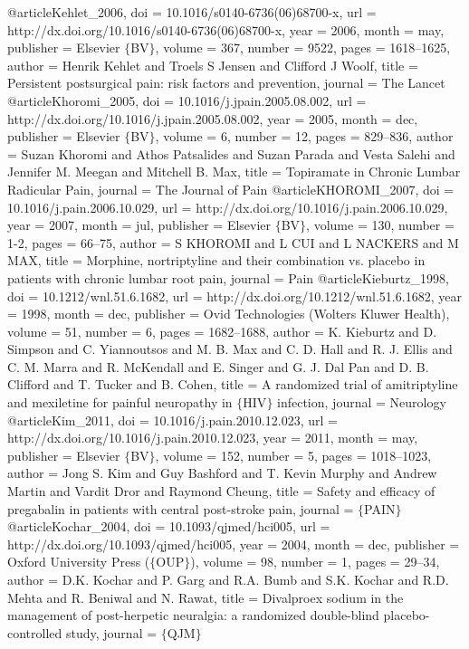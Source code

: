 @article{Kehlet_2006,
	doi = {10.1016/s0140-6736(06)68700-x},
	url = {http://dx.doi.org/10.1016/s0140-6736(06)68700-x},
	year = 2006,
	month = {may},
	publisher = {Elsevier $\lbrace$BV$\rbrace$},
	volume = {367},
	number = {9522},
	pages = {1618--1625},
	author = {Henrik Kehlet and Troels S Jensen and Clifford J Woolf},
	title = {Persistent postsurgical pain: risk factors and prevention},
	journal = {The Lancet}
}
@article{Khoromi_2005,
	doi = {10.1016/j.jpain.2005.08.002},
	url = {http://dx.doi.org/10.1016/j.jpain.2005.08.002},
	year = 2005,
	month = {dec},
	publisher = {Elsevier $\lbrace$BV$\rbrace$},
	volume = {6},
	number = {12},
	pages = {829--836},
	author = {Suzan Khoromi and Athos Patsalides and Suzan Parada and Vesta Salehi and Jennifer M. Meegan and Mitchell B. Max},
	title = {Topiramate in Chronic Lumbar Radicular Pain},
	journal = {The Journal of Pain}
}
@article{KHOROMI_2007,
	doi = {10.1016/j.pain.2006.10.029},
	url = {http://dx.doi.org/10.1016/j.pain.2006.10.029},
	year = 2007,
	month = {jul},
	publisher = {Elsevier $\lbrace$BV$\rbrace$},
	volume = {130},
	number = {1-2},
	pages = {66--75},
	author = {S KHOROMI and L CUI and L NACKERS and M MAX},
	title = {Morphine, nortriptyline and their combination vs. placebo in patients with chronic lumbar root pain},
	journal = {Pain}
}
@article{Kieburtz_1998,
	doi = {10.1212/wnl.51.6.1682},
	url = {http://dx.doi.org/10.1212/wnl.51.6.1682},
	year = 1998,
	month = {dec},
	publisher = {Ovid Technologies (Wolters Kluwer Health)},
	volume = {51},
	number = {6},
	pages = {1682--1688},
	author = {K. Kieburtz and D. Simpson and C. Yiannoutsos and M. B. Max and C. D. Hall and R. J. Ellis and C. M. Marra and R. McKendall and E. Singer and G. J. Dal Pan and D. B. Clifford and T. Tucker and B. Cohen},
	title = {A randomized trial of amitriptyline and mexiletine for painful neuropathy in $\lbrace$HIV$\rbrace$ infection},
	journal = {Neurology}
}
@article{Kim_2011,
	doi = {10.1016/j.pain.2010.12.023},
	url = {http://dx.doi.org/10.1016/j.pain.2010.12.023},
	year = 2011,
	month = {may},
	publisher = {Elsevier $\lbrace$BV$\rbrace$},
	volume = {152},
	number = {5},
	pages = {1018--1023},
	author = {Jong S. Kim and Guy Bashford and T. Kevin Murphy and Andrew Martin and Vardit Dror and Raymond Cheung},
	title = {Safety and efficacy of pregabalin in patients with central post-stroke pain},
	journal = {$\lbrace$PAIN$\rbrace$}
}
@article{Kochar_2004,
	doi = {10.1093/qjmed/hci005},
	url = {http://dx.doi.org/10.1093/qjmed/hci005},
	year = 2004,
	month = {dec},
	publisher = {Oxford University Press ($\lbrace$OUP$\rbrace$)},
	volume = {98},
	number = {1},
	pages = {29--34},
	author = {D.K. Kochar and P. Garg and R.A. Bumb and S.K. Kochar and R.D. Mehta and R. Beniwal and N. Rawat},
	title = {Divalproex sodium in the management of post-herpetic neuralgia: a randomized double-blind placebo-controlled study},
	journal = {$\lbrace$QJM$\rbrace$}
}
